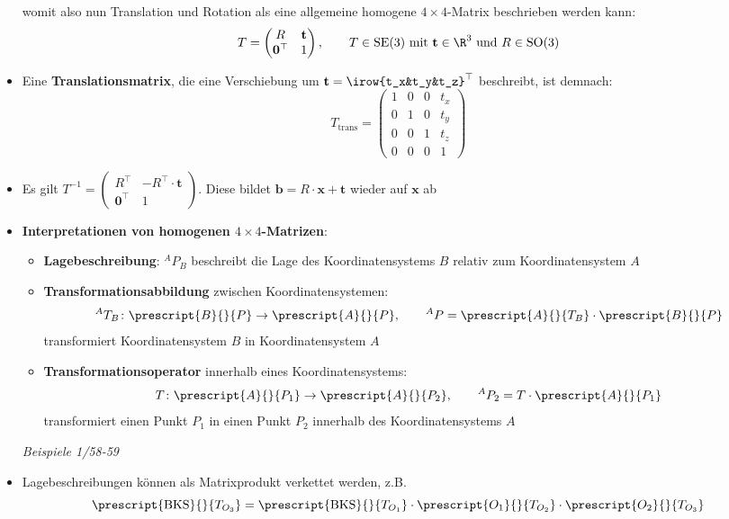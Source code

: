 \begin{itemize}
	womit also nun Translation und Rotation als eine allgemeine homogene $4\times4$-Matrix beschrieben werden kann:
	$$T=
	\left(\begin{matrix}
		R & \mathbf{t} \\
		\mathbf{0}^\top & 1
	\end{matrix}\right), \qquad T\in\text{SE(3)}\text{ mit } \mathbf{t}\in\R^3\text{ und }R\in\text{SO(3)}$$
	\item Eine \textbf{Translationsmatrix}, die eine Verschiebung um $\mathbf{t}=\irow{t_x&t_y&t_z}^\top$ beschreibt, ist demnach:
	$$T_\text{trans}=\left(\begin{matrix}
		1 & 0 & 0 & t_x \\
		0 & 1 & 0 & t_y \\
		0 & 0 & 1 & t_z \\
		0 & 0 & 0 & 1
	\end{matrix}\right)$$
	\item Es gilt $T^{-1}=\left(\begin{matrix}
		R^\top & -R^\top\cdot\mathbf{t}  \\
		\mathbf{0}^\top & 1 
	\end{matrix}\right)$. Diese bildet $\mathbf{b}=R\cdot\mathbf{x}+\mathbf{t}$ wieder auf $\mathbf{x}$ ab
	\item \textbf{Interpretationen von homogenen $4\times4$-Matrizen}:
	\begin{itemize}
		\item \textbf{Lagebeschreibung}: $^AP_B$ beschreibt die Lage des Koordinatensystems $B$ relativ zum Koordinatensystem $A$
		\item \textbf{Transformationsabbildung} zwischen Koordinatensystemen:
		$$^AT_B\colon\prescript{B}{}{P}\rightarrow \prescript{A}{}{P},\qquad ^AP=\prescript{A}{}{T_B}\cdot\prescript{B}{}{P}$$
		transformiert Koordinatensystem $B$ in Koordinatensystem $A$
		\item \textbf{Transformationsoperator} innerhalb eines Koordinatensystems:
		$$T\colon\prescript{A}{}{P_1}\rightarrow \prescript{A}{}{P_2},\qquad ^AP_2=T\cdot \prescript{A}{}{P_1}$$
		transformiert einen Punkt $P_1$ in einen Punkt $P_2$ innerhalb des Koordinatensystems $A$ 
	\end{itemize}
	\medskip
	\textit{Beispiele 1/58-59}
	\item Lagebeschreibungen können als Matrixprodukt verkettet werden, z.B. 
	$$\prescript{\text{BKS}}{}{T_{O_3}}=\prescript{\text{BKS}}{}{T_{O_1}}\cdot\prescript{O_1}{}{T_{O_2}}\cdot\prescript{O_2}{}{T_{O_3}}$$
\end{itemize}
